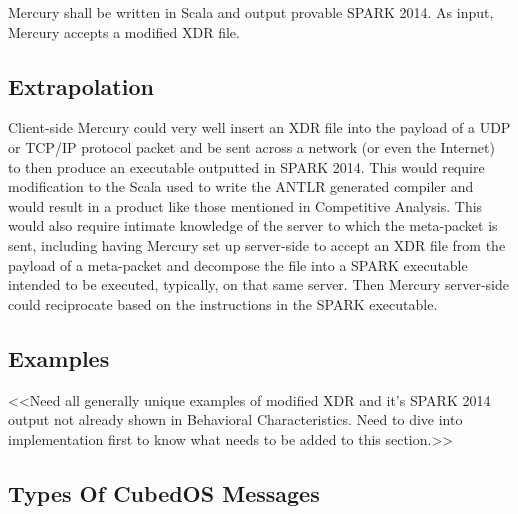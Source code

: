 Mercury shall be written in Scala and output provable SPARK 2014. As input, Mercury accepts a
modified XDR file.

\subsection{Extrapolation}

Client-side Mercury could very well insert an XDR file into the payload of a UDP or TCP/IP
protocol packet and be sent across a network (or even the Internet) to then produce an
executable outputted in SPARK 2014. This would require modification to the Scala used to write
the ANTLR generated compiler and would result in a product like those mentioned in Competitive
Analysis. This would also require intimate knowledge of the server to which the meta-packet is
sent, including having Mercury set up server-side to accept an XDR file from the payload of a
meta-packet and decompose the file into a SPARK executable intended to be executed, typically,
on that same server. Then Mercury server-side could reciprocate based on the instructions in the
SPARK executable.

\subsection{Examples}

<<Need all generally unique examples of modified XDR and it’s SPARK 2014 output not already
shown in Behavioral Characteristics. Need to dive into implementation first to know what needs
to be added to this section.>>

\subsection{Types Of CubedOS Messages}
